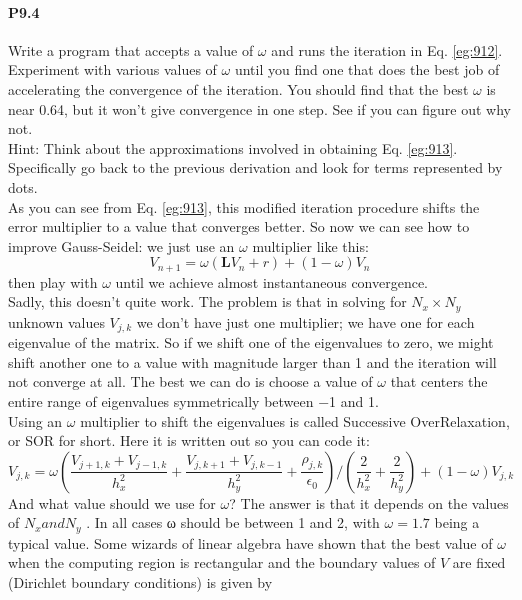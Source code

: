 \documentclass{book}
\theoremstyle{plain}
\theoremstyle{definition}
\numberwithin{exm}{chapter}
\theoremstyle{remark}
\theoremstyle{summary}
\theoremstyle{overview}
\begin{document}
\paragraph*{P9.4} Write a program that accepts a value of $\omega$ and runs the iteration in Eq. \eqref{eg:912}.
Experiment with various values of $\omega$ until you find one that does the best
job of accelerating the convergence of the iteration. You should find that
the best $\omega$ is near 0.64, but it won’t give convergence in one step. See if you
can figure out why not.\\
Hint: Think about the approximations involved in obtaining Eq. \eqref{eg:913}. Specifically go back to the previous derivation and look for terms represented by dots.\\
As you can see from Eq. \eqref{eg:913}, this modified iteration procedure shifts the
error multiplier to a value that converges better. So now we can see how to
improve Gauss-Seidel: we just use an $\omega$ multiplier like this:
\begin{equation}\label{eq:914}
V_{n+1}=\omega\left(\mathbf{L} V_{n}+r\right)+(1-\omega) V_{n}
\end{equation}
then play with $\omega$ until we achieve almost instantaneous convergence. \\ 
Sadly, this doesn\rq t quite work. The problem is that in solving for $N_x × N_y$
unknown values $V_{j,k}$ we don\rq t have just one multiplier; we have one for each
eigenvalue of the matrix. So if we shift one of the eigenvalues to zero, we might
shift another one to a value with magnitude larger than 1 and the iteration will
not converge at all. The best we can do is choose a value of $\omega$ that centers the
entire range of eigenvalues symmetrically between −1 and 1. \\ 
Using an $\omega$ multiplier to shift the eigenvalues is called Successive OverRelaxation, or SOR for short. Here it is written out so you can code it:
\begin{equation}\label{eq:915}
V_{j, k}=\omega\left(\frac{V_{j+1, k}+V_{j-1, k}}{h_{x}^{2}}+\frac{V_{j, k+1}+V_{j, k-1}}{h_{y}^{2}}+\frac{\rho_{j, k}}{\epsilon_{0}}\right) /\left(\frac{2}{h_{x}^{2}}+\frac{2}{h_{y}^{2}}\right)+(1-\omega) V_{j, k}
\end{equation}
And what value should we use for $\omega$? The answer is that it depends on the values
of $N_x and N_y$ . In all cases ω should be between 1 and 2, with $\omega = 1.7$ being a
typical value. Some wizards of linear algebra have shown that the best value of $\omega$ when the computing region is rectangular and the boundary values of $V$ are fixed (Dirichlet boundary conditions) is given by
\end{document}
